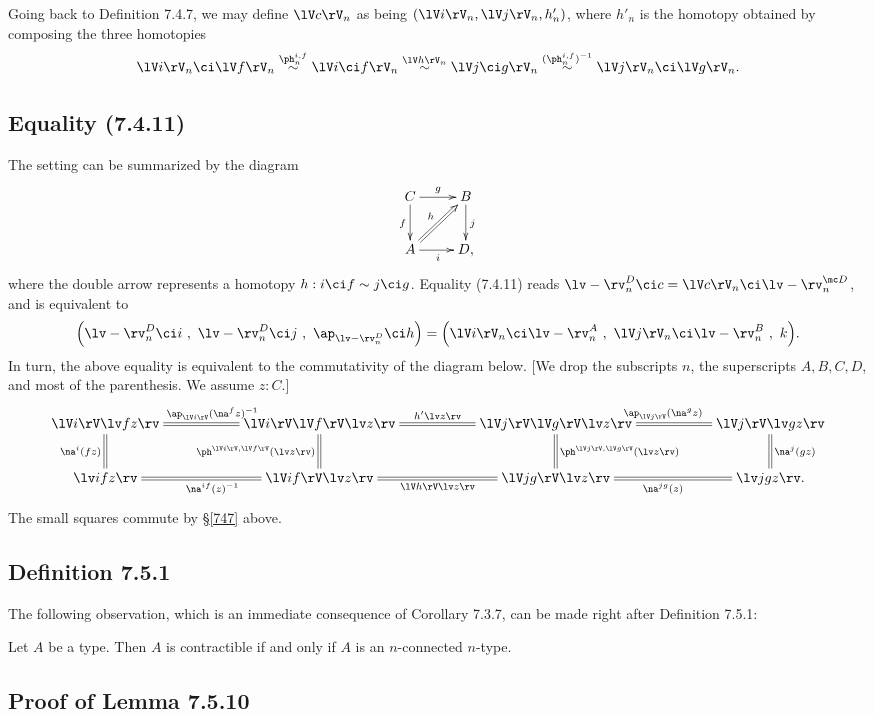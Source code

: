 \documentclass[12pt]{article}
\begin{document}
Going back to Definition 7.4.7, we may define $\lV c\rV_n$ as being $(\lV i\rV_n,\lV j\rV_n,h'_n)$, where $h'_n$ is the homotopy obtained by composing the three homotopies
$$
\lV i\rV_n\ci\lV f\rV_n\overset{\ph_n^{i,f}}{\sim}\lV i\ci f\rV_n\overset{\lV h\rV_n}{\sim}\lV j\ci g\rV_n\overset{(\ph_n^{i,f})^{-1}}{\sim}\lV j\rV_n\ci\lV g\rV_n.
$$


\subsection{Equality (7.4.11)}

The setting can be summarized by the diagram 
$$
\xymatrix{C\ar[r]^g\ar[d]_f&B\ar[d]^j\\ A\ar[r]_i\ar@{=>}[ur]^h&D,}
$$ 
where the double arrow represents a homotopy $h:i\ci f\sim j\ci g$. Equality (7.4.11) reads $\lv-\rv^D_n\ci c=\lV c\rV_n\ci\lv-\rv^{\mc D}_n$, and is equivalent to
$$
\Big(\lv-\rv^D_n\ci i\ ,\ \lv-\rv^D_n\ci j\ ,\ \ap_{\lv-\rv^D_n}\ci h\Big)
=
\Big(\lV i\rV_n\ci\lv-\rv^A_n\ ,\ \lV j\rV_n\ci\lv-\rv^B_n\ ,\ k\Big).
$$
In turn, the above equality is equivalent to the commutativity of the diagram below. [We drop the subscripts $n$, the superscripts $A,B,C,D$, and most of the parenthesis. We assume $z:C$.] 
$$ 
\xymatrix{
\lV i\rV\lv fz\rv\ar@{=}[d]_{\na^i(fz)}&&
\lV i\rV\lV f\rV\lv z\rv\ar@{=}[ll]_{\ap_{\lV i\rV}(\na^fz)^{-1}}\ar@{=}[d]_{\ph^{\lV i\rV,\lV f\rV}(\lv z\rv)}\ar@{=}[rr]^{h'\lv z\rv}&&
\lV j\rV\lV g\rV\lv z\rv\ar@{=}[d]^{\ph^{\lV j\rV,\lV g\rV}(\lv z\rv)}\ar@{=}[rr]^{\ap_{\lV j\rV}(\na^gz)}&&
\lV j\rV\lv gz\rv\ar@{=}[d]^{\na^j(gz)}\\
%
\lv ifz\rv&&\lV if\rV\lv z\rv\ar@{=}[rr]_{\lV h\rV\lv z\rv}\ar@{=}[ll]^{\na^{if}(z)^{-1}}&&\lV jg\rV\lv z\rv\ar@{=}[rr]_{\na^{jg}(z)}&&\lv jgz\rv.}
$$ 
The small squares commute by \S\ref{747} above.


\subsection{Definition 7.5.1}\label{751}

The following observation, which is an immediate consequence of Corollary 7.3.7, can be made right after Definition 7.5.1:

Let $A$ be a type. Then $A$ is contractible if and only if $A$ is an $n$-connected $n$-type.


\subsection{Proof of Lemma 7.5.10}
\end{document}
